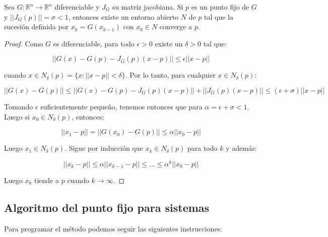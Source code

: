 \begin{theorem}\label{TPF}
	Sea $G : \mathbb{R}^n \to \mathbb{R}^n$ diferenciable y $J_G$ su matriz jacobiana.
	Si $p$ es un punto fijo de $G$ y $||J_G(p)|| = \sigma < 1$, entonces existe un entorno abierto $N$ de $p$ tal que la sucesión definida por $x_{k}=G(x_{k-1})$ con $x_{0}\in N$ converge a $p$.
\end{theorem}
\begin{proof}
	Como $G$ es diferenciable, para todo $\epsilon > 0$ existe un $\delta > 0$ tal que:
	
	\[ ||G(x) - G(p) - J_G(p)(x-p) || \leq \epsilon ||x-p|| \]
	
	cuando $x \in N_\delta(p)=\{x : ||x-p||<\delta\}$. Por lo tanto, para cualquier $x \in N_\delta(p)$:
	
	\[ ||G(x)-G(p)|| \leq ||G(x) - G(p) - J_G(p)(x-p)|| + ||J_G(p)(x-p)|| \leq (\epsilon+\sigma) ||x-p|| \]
	
	Tomando $\epsilon$ suficientemente pequeño, tenemos entonces que para $\alpha=\epsilon+\sigma<1$. Luego si $x_{0} \in N_\delta(p)$, entonces:
	
	\[ ||x_{1}-p|| = ||G(x_{0})-G(p)|| \leq \alpha ||x_{0} - p|| \]
	
	Luego $x_{1} \in N_\delta(p)$. Sigue por inducción que $x_{k} \in N_\delta(p)$ para todo $k$ y además:
	
	\[ ||x_{k}-p|| \leq \alpha ||x_{k-1}-p|| \leq \dots \leq \alpha^k ||x_{0}-p|| \]
	
	Luego $x_{k}$ tiende a $p$ cuando $k \to \infty$.
\end{proof}

\subsection{Algoritmo del punto fijo para sistemas}

Para programar el método podemos seguir las siguientes instrucciones: 


